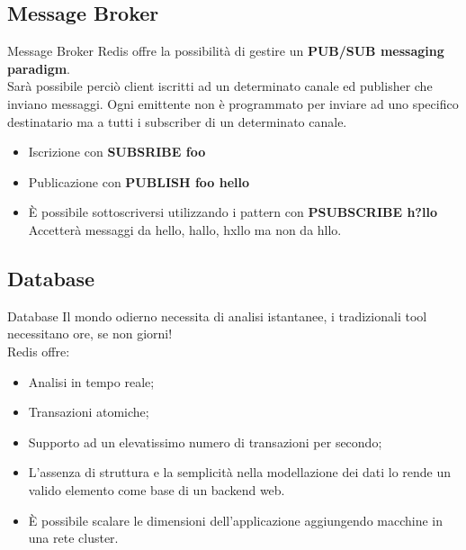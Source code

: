 \documentclass[xcolor=dvipsnames]{beamer}
\begin{document}
    \subsection{Message Broker}
    \begin{frame}{Message Broker}
      Redis offre la possibilità di gestire un \textbf{PUB/SUB messaging paradigm}. \\
      Sarà possibile perciò client iscritti ad un determinato canale ed publisher che inviano messaggi.
      Ogni emittente non è programmato per inviare ad uno specifico destinatario ma a tutti i subscriber di un determinato canale.
      \begin{itemize}
        \item Iscrizione con \textbf{SUBSRIBE foo}
        \item Publicazione con \textbf{PUBLISH foo hello}
        \item È possibile sottoscriversi utilizzando i pattern con \textbf{PSUBSCRIBE h?llo} \\
              Accetterà messaggi da hello, hallo, hxllo ma non da hllo.
      \end{itemize}
    \end{frame}

    \subsection{Database}
      \begin{frame}{Database}
          Il mondo odierno necessita di analisi istantanee, i tradizionali tool necessitano ore, se non giorni! \\
          Redis offre: \\
          \begin{itemize}
            \item Analisi in tempo reale;
            \item Transazioni atomiche;
            \item Supporto ad un elevatissimo numero di transazioni per secondo;
            \item L'assenza di struttura e la semplicità nella modellazione dei dati lo rende un valido elemento come base di un backend web.
            \item È possibile scalare le dimensioni dell'applicazione aggiungendo macchine in una rete cluster.
          \end{itemize}
      \end{frame}
\end{document}

